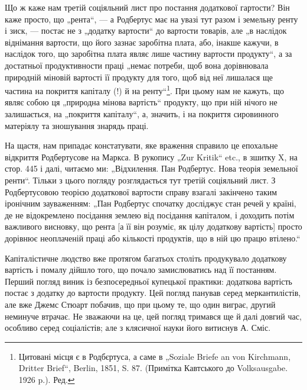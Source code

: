Що ж каже нам третій соціяльний лист про постання додаткової
гартости? Він каже просто, що „рента“, — а Родбертус має на увазі тут
разом і земельну ренту і зиск, — постає не з „додатку вартости“ до
вартости товарів, але „в наслідок віднімання вартости, що його зазнає заробітна
плата, або, інакше кажучи, в наслідок того, що заробітна плата
являє лише частину вартости продукту“, а за достатньої продуктивности
праці „немає потреби, щоб вона дорівнювала природній міновій вартості
її продукту для того, щоб від неї лишалася ще частина на покриття
капіталу (!) й на ренту“\footnote*{
Цитовані місця є в Родбєртуса, а саме в „Soziale Briefe an von Kirchmann,
Dritter Brief“, Berlin, 1851, S. 87. (Примітка Кавтського до Volksausgabe. 1926 p.).
Ред.
}. При цьому нам не кажуть, що являє собою
ця „природна мінова вартість“ продукту, що при ній нічого не залишається,
на „покриття капіталу“, а, значить, і на покриття сировинного
матеріялу та зношування знарядь праці.

На щастя, нам припадає констатувати, яке враження справило це епохальне
відкриття Родбертусове на Маркса. В рукопису „Zur Kritik“ etc., в зшитку X,
на стор. 445 і далі, читаємо ми: „Відхилення. Пан Родбертус. Нова теорія
земельної ренти“. Тільки з цього погляду розглядається тут третій соціяльний
лист. З Родбертусовою теорією додаткової вартости справу взагалі
закінчено таким іронічним зауваженням: „Пан Родбертус спочатку досліджує
стан речей у країні, де не відокремлено посідання землею від посідання
капіталом, і доходить потім важливого висновку, що рента [а її
він розуміє, як цілу додаткову вартість] просто дорівнює неоплаченій
праці або кількості продуктів, що в ній цю працю втілено.“

Капіталістичне людство вже протягом багатьох століть продукувало
додаткову вартість і помалу дійшло того, що почало замислюватись над
її постанням. Перший погляд виник із безпосередньої купецької
практики: додаткова вартість постає з додатку до вартости продукту.
Цей погляд панував серед меркантилістів, але вже Джемс Стюарт побачив,
що при цьому те, що один виграє, другий неминуче втрачає. Не зважаючи
на це, цей погляд тримався ще й далі довгий час, особливо серед
соціалістів; але з клясичної науки його витиснув А. Сміс.

